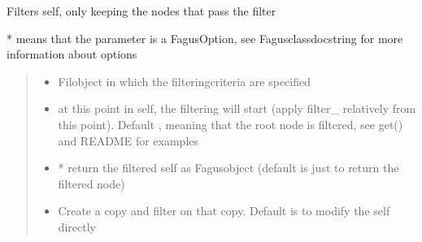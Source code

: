 \documentclass[a4paper,10pt,english]{sphinxmanual}
\begin{document}
\begin{fulllineitems}
\begin{fulllineitems}
\label{\detokenize{fagus.fagus:fagus.fagus.Fagus.filter}}
\pysigstartsignatures
{}
\pysigstopsignatures
\sphinxAtStartPar
Filters self, only keeping the nodes that pass the filter

\sphinxAtStartPar
* means that the parameter is a FagusOption, see Fagus\sphinxhyphen{}class\sphinxhyphen{}docstring for more information about options
\begin{quote}\begin{description}
\begin{itemize}
\item {}
\sphinxAtStartPar
{} \textendash{} Fil\sphinxhyphen{}object in which the filtering\sphinxhyphen{}criteria are specified

\item {}
\sphinxAtStartPar
{} \textendash{} at this point in self, the filtering will start (apply filter\_ relatively from this point).
Default , meaning that the root node is filtered, see get() and README for examples

\item {}
\sphinxAtStartPar
{} \textendash{} * return the filtered self as Fagus\sphinxhyphen{}object (default is just to return the filtered node)

\item {}
\sphinxAtStartPar
{} \textendash{} Create a copy and filter on that copy. Default is to modify the self directly


\end{itemize}
\end{description}
\end{quote}
\end{fulllineitems}
\end{fulllineitems}
\end{document}
